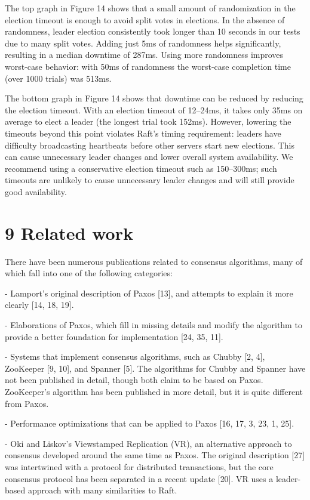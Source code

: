 \documentclass[
]{article}
\begin{document}
The top graph in Figure 14 shows that a small amount of randomization in
the election timeout is enough to avoid split votes in elections. In the
absence of randomness, leader election consistently took longer than 10
seconds in our tests due to many split votes. Adding just 5ms of
randomness helps significantly, resulting in a median downtime of 287ms.
Using more randomness improves worst-case behavior: with 50ms of
randomness the worst-case completion time (over 1000 trials) was 513ms.

The bottom graph in Figure 14 shows that downtime can be reduced by
reducing the election timeout. With an election timeout of 12--24ms, it
takes only 35ms on average to elect a leader (the longest trial took
152ms). However, lowering the timeouts beyond this point violates Raft's
timing requirement: leaders have difficulty broadcasting heartbeats
before other servers start new elections. This can cause unnecessary
leader changes and lower overall system availability. We recommend using
a conservative election timeout such as 150--300ms; such timeouts are
unlikely to cause unnecessary leader changes and will still provide good
availability.

\section{9 Related work}\label{related-work}

There have been numerous publications related to consensus algorithms,
many of which fall into one of the following categories:

- Lamport's original description of Paxos {[}13{]}, and attempts to
explain it more clearly {[}14, 18, 19{]}.

- Elaborations of Paxos, which fill in missing details and modify the
algorithm to provide a better foundation for implementation {[}24, 35,
11{]}.

- Systems that implement consensus algorithms, such as Chubby {[}2,
4{]}, ZooKeeper {[}9, 10{]}, and Spanner {[}5{]}. The algorithms for
Chubby and Spanner have not been published in detail, though both claim
to be based on Paxos. ZooKeeper's algorithm has been published in more
detail, but it is quite different from Paxos.

- Performance optimizations that can be applied to Paxos {[}16, 17, 3,
23, 1, 25{]}.

- Oki and Liskov's Viewstamped Replication (VR), an alternative approach
to consensus developed around the same time as Paxos. The original
description {[}27{]} was intertwined with a protocol for distributed
transactions, but the core consensus protocol has been separated in a
recent update {[}20{]}. VR uses a leader-based approach with many
similarities to Raft.
\end{document}
